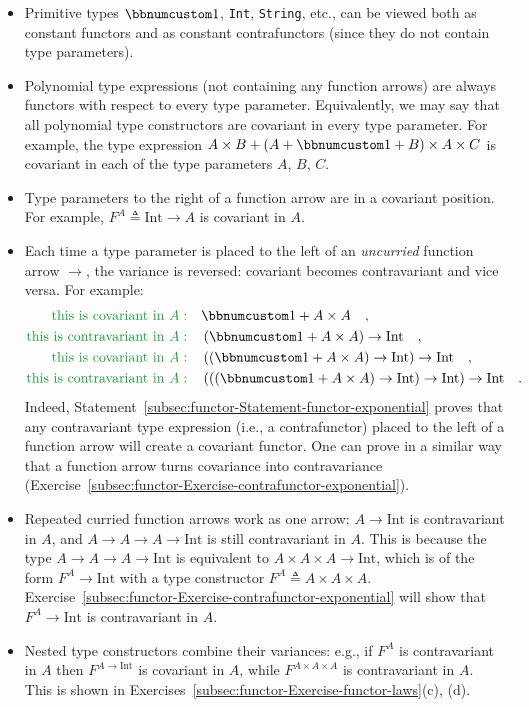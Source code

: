 \begin{itemize}
\item Primitive types $\bbnum 1$, \lstinline!Int!, \lstinline!String!,
etc., can be viewed both as constant functors and as constant contrafunctors
(since they do not contain type parameters).
\item Polynomial type expressions (not containing any function arrows) are
always functors with respect to every type
parameter. Equivalently, we may say that all polynomial type constructors
are covariant in every type parameter. For example, the type expression
$A\times B+\left(A+\bbnum 1+B\right)\times A\times C$ is covariant
in each of the type parameters $A$, $B$, $C$.
\item Type parameters to the right of a function arrow are in a covariant
position. For example, $F^{A}\triangleq\text{Int}\rightarrow A$ is
covariant in $A$.
\item Each time a type parameter is placed to the left of an \emph{uncurried}
function arrow $\rightarrow$, the variance is reversed: covariant
becomes contravariant and vice versa. For example:
\begin{align*}
{\color{greenunder}\text{this is covariant in }A:}\quad & \bbnum 1+A\times A\quad,\\
{\color{greenunder}\text{this is contravariant in }A:}\quad & \left(\bbnum 1+A\times A\right)\rightarrow\text{Int}\quad,\\
{\color{greenunder}\text{this is covariant in }A:}\quad & \left(\left(\bbnum 1+A\times A\right)\rightarrow\text{Int}\right)\rightarrow\text{Int}\quad,\\
{\color{greenunder}\text{this is contravariant in }A:}\quad & \left(\left(\left(\bbnum 1+A\times A\right)\rightarrow\text{Int}\right)\rightarrow\text{Int}\right)\rightarrow\text{Int}\quad.
\end{align*}
Indeed, Statement~\ref{subsec:functor-Statement-functor-exponential}
proves that any contravariant type expression (i.e., a contrafunctor)
placed to the left of a function arrow will create a covariant functor.
One can prove in a similar way that a function arrow turns covariance
into contravariance (Exercise~\ref{subsec:functor-Exercise-contrafunctor-exponential}).
\item Repeated curried function arrows work as one arrow: $A\rightarrow\text{Int}$
is contravariant in $A$, and $A\rightarrow A\rightarrow A\rightarrow\text{Int}$
is still contravariant in $A$. This is  because the type $A\rightarrow A\rightarrow A\rightarrow\text{Int}$
is equivalent to $A\times A\times A\rightarrow\text{Int}$, which
is of the form $F^{A}\rightarrow\text{Int}$ with a type constructor
$F^{A}\triangleq A\times A\times A$. Exercise~\ref{subsec:functor-Exercise-contrafunctor-exponential}
will show that $F^{A}\rightarrow\text{Int}$ is contravariant in $A$.
\item Nested type constructors combine their variances: e.g., if $F^{A}$
is contravariant in $A$ then $F^{A\rightarrow\text{Int}}$ is covariant
in $A$, while $F^{A\times A\times A}$ is contravariant in $A$.
This is shown in Exercises~\ref{subsec:functor-Exercise-functor-laws}(c),
(d).
\end{itemize}
